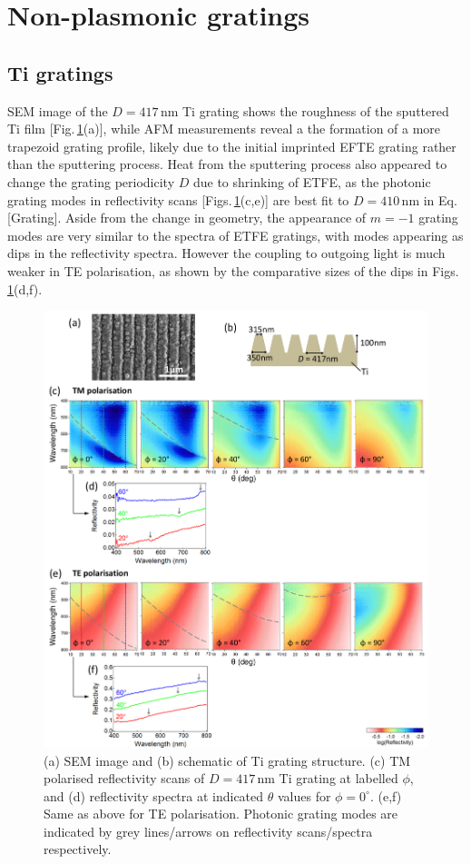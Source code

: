 \section{Non-plasmonic gratings}

\subsection{Ti gratings}
SEM image of the $D=417$\,nm Ti grating shows the roughness of the sputtered Ti film [Fig.\,\ref{7Fig4}(a)], while AFM measurements reveal a the formation of a more trapezoid grating profile, likely due to the initial imprinted EFTE grating rather than the sputtering process. Heat from the sputtering process also appeared to change the grating periodicity $D$ due to shrinking of ETFE, as the photonic grating modes in reflectivity scans [Figs.\,\ref{7Fig4}(c,e)] are best fit to $D=410$\,nm in Eq.[Grating]. Aside from the change in geometry, the appearance of $m=-1$ grating modes are very similar to the spectra of ETFE gratings, with modes appearing as dips in the reflectivity spectra. However the coupling to outgoing light is much weaker in TE polarisation, as shown by the comparative sizes of the dips in Figs.\,\ref{7Fig4}(d,f).
\begin{figure}[ht] 
\centering    
\includegraphics[width=\textwidth]{Fig4}
\caption{(a) SEM image and (b) schematic of Ti grating structure. (c) TM polarised reflectivity scans of $D=417$\,nm Ti grating at labelled $\phi$, and (d) reflectivity spectra at indicated $\theta$ values for $\phi=0^{\circ}$. (e,f) Same as above for TE polarisation. Photonic grating modes are indicated by grey lines/arrows on reflectivity scans/spectra respectively.}
\label{7Fig4}
\end{figure}

